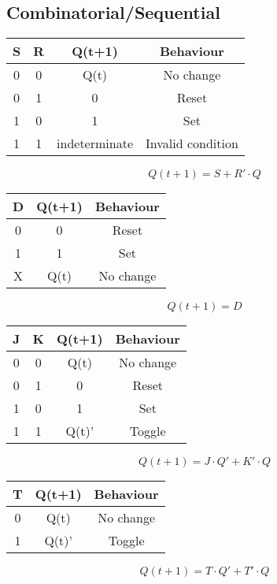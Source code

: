 \documentclass[a4paper]{article}
\begin{document}
\begin{multicols*}{3}
  \subsection*{Combinatorial/Sequential}
    \begin{center}
      \begin{tabular}{ |cc|c|c| }
        \hline
        S & R & Q(t+1) & Behaviour \\
        \hline
        0 & 0 & Q(t) & No change \\
        0 & 1 & 0 & Reset \\
        1 & 0 & 1 & Set \\
        1 & 1 & indeterminate & Invalid condition \\
        \hline
      \end{tabular}
      \begin{equation*}
        Q(t+1) = S + R' \cdot Q
      \end{equation*}
      \begin{tabular}{ |c|c|c| }
        \hline
        D & Q(t+1) & Behaviour \\
        \hline
        0 & 0 & Reset \\
        1 & 1 & Set \\
        X & Q(t) & No change \\
        \hline
      \end{tabular}
      \begin{equation*}
        Q(t+1) = D
      \end{equation*}
      \begin{tabular}{ |cc|c|c| }
        \hline
        J & K & Q(t+1) & Behaviour \\
        \hline
        0 & 0 & Q(t) & No change \\
        0 & 1 & 0 & Reset \\
        1 & 0 & 1 & Set \\
        1 & 1 & Q(t)' & Toggle \\
        \hline
      \end{tabular}
      \begin{equation*}
        Q(t+1) = J \cdot Q' + K' \cdot Q
      \end{equation*}
      \begin{tabular}{ |c|c|c| }
        \hline
        T & Q(t+1) & Behaviour \\
        \hline
        0 & Q(t) & No change \\
        1 & Q(t)' & Toggle \\
        \hline
      \end{tabular}
      \begin{equation*}
        Q(t+1) = T \cdot Q' + T' \cdot Q
      \end{equation*}
    \end{center}

\end{multicols*}
\end{document}
